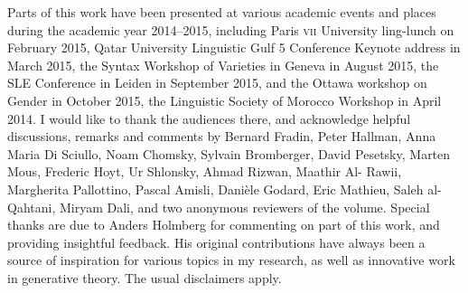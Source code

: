 Parts of this work have been presented at various academic events and places
during the academic year 2014--2015, including Paris \textsc{vii} University
ling-lunch on February 2015, Qatar University Linguistic Gulf 5 Conference
Keynote address in March 2015, the Syntax Workshop of  Varieties in
Geneva in August 2015, the SLE Conference in Leiden in September 2015, and the
Ottawa workshop on Gender in October 2015, the Linguistic Society of Morocco
Workshop in April 2014. I would like to thank the audiences there, and
acknowledge helpful discussions, remarks and comments by Bernard Fradin, Peter
Hallman, Anna Maria Di Sciullo, Noam Chomsky, Sylvain Bromberger, David
Pesetsky, Marten Mous, Frederic Hoyt, Ur Shlonsky, Ahmad Rizwan, Maathir Al-
Rawii, Margherita Pallottino, Pascal Amisli, Danièle Godard, Eric Mathieu,
Saleh al-Qahtani, Miryam Dali, and two anonymous reviewers of the volume.
Special thanks are due to Anders Holmberg for commenting on part of this work, and
providing insightful feedback. His original contributions have always been a source of inspiration for various topics in my research, as well as innovative work
in generative theory. The usual disclaimers apply.

{\sloppy
  \printbibliography[heading=subbibliography,notkeyword=this]
}

